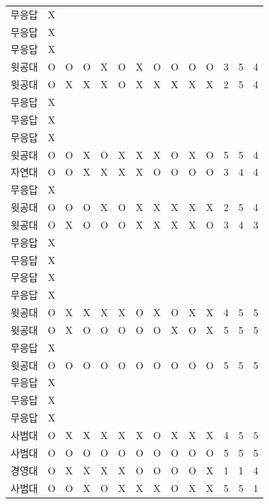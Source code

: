 \documentclass[11pt,a4paper]{article}
\begin{document}
\begin{center}
\begin{supertabular}{ | p{2cm} | x{1.6cm} | x{0.5cm} | x{0.5cm} | x{0.5cm} | x{0.5cm} | x{0.5cm} | x{0.5cm} | x{0.5cm} | x{0.5cm} | x{0.5cm} | x{0.5cm} | x{0.5cm} | x{0.5cm} | }
무응답 & X & & & & & & & & & & & & \\
무응답 & X & & & & & & & & & & & & \\
무응답 & X & & & & & & & & & & & & \\
윗공대 & O & O & O & X & O & X & O & O & O & O & 3 & 5 & 4 \\
윗공대 & O & X & X & X & O & X & X & X & X & X & 2 & 5 & 4 \\
무응답 & X & & & & & & & & & & & & \\
무응답 & X & & & & & & & & & & & & \\
무응답 & X & & & & & & & & & & & & \\
윗공대 & O & O & X & O & X & X & X & O & X & O & 5 & 5 & 4 \\
자연대 & O & O & X & X & X & X & O & O & O & O & 3 & 4 & 4 \\
무응답 & X & & & & & & & & & & & & \\
윗공대 & O & O & O & X & O & X & X & X & X & X & 2 & 5 & 4 \\
윗공대 & O & X & O & O & O & X & X & X & X & O & 3 & 4 & 3 \\
무응답 & X & & & & & & & & & & & & \\
무응답 & X & & & & & & & & & & & & \\
무응답 & X & & & & & & & & & & & & \\
무응답 & X & & & & & & & & & & & & \\
윗공대 & O & X & X & X & X & O & X & O & X & X & 4 & 5 & 5 \\
윗공대 & O & X & O & O & O & O & O & X & O & X & 5 & 5 & 5 \\
무응답 & X & & & & & & & & & & & & \\
윗공대 & O & O & O & O & O & O & O & O & O & O & 5 & 5 & 5 \\
무응답 & X & & & & & & & & & & & & \\
무응답 & X & & & & & & & & & & & & \\
무응답 & X & & & & & & & & & & & & \\
사범대 & O & X & X & X & X & X & O & X & X & X & 4 & 5 & 5 \\
사범대 & O & O & O & O & O & O & O & O & O & O & 5 & 5 & 5 \\
경영대 & O & X & X & X & X & O & O & O & O & X & 1 & 1 & 4 \\
사범대 & O & O & X & O & X & X & X & O & X & X & 5 & 5 & 1 \\
\hline
\end{supertabular}
\end{center}
\end{document}
